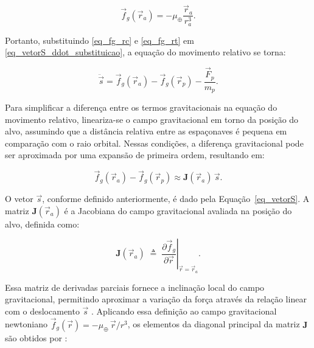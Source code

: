 \begin{equation}
\label{eq_fg_rt}
\vec f_g(\vec r_a) = -\mu_\oplus \frac{\vec r_a}{r_a^3}.
\end{equation}

Portanto, substituindo \eqref{eq_fg_rc} e \eqref{eq_fg_rt} em \eqref{eq_vetorS_ddot_substituicao}, a equação do movimento relativo se torna:

\begin{equation}
\label{eq_fg_rc_fg_rt}
\ddot{\vec s}
=
\vec f_g(\vec r_a) - \vec f_g(\vec r_p) - \frac{\vec F_p}{m_p}.
\end{equation}


Para simplificar a diferença entre os termos gravitacionais na equação do movimento relativo, lineariza-se o campo gravitacional em torno da posição do alvo, assumindo que a distância relativa entre as espaçonaves é pequena em comparação com o raio orbital. Nessas condições, a diferença gravitacional pode ser aproximada por uma expansão de primeira ordem, resultando em:

\begin{equation}
\label{eq_linearizandoJacobiana}
\vec f_g(\vec r_{a}) - \vec f_g(\vec r_{p}) \approx \mathbf{J}(\vec r_{a})\,\vec s.
\end{equation}

O vetor $\vec s$, conforme definido anteriormente, é dado pela Equação~\ref{eq_vetorS}.
A matriz $\mathbf{J}(\vec r_a)$ é a Jacobiana do campo gravitacional avaliada na posição do alvo, definida como:

\begin{equation}
\mathbf{J}(\vec r_a) \;\triangleq\; \left.\frac{\partial \vec f_g}{\partial \vec r}\right|_{\vec r=\vec r_a}.
\end{equation}

Essa matriz de derivadas parciais fornece a inclinação local do campo gravitacional, permitindo aproximar a variação da força através da relação linear com o deslocamento $\vec{s}$ \cite{khalil2002nonlinear}.
Aplicando essa definição ao campo gravitacional newtoniano $\vec f_g(\vec r)=-\mu_\oplus\,\vec r/r^{3}$, os elementos da diagonal principal da matriz $\mathbf{J}$ são obtidos por \cite{fehse2003}:


